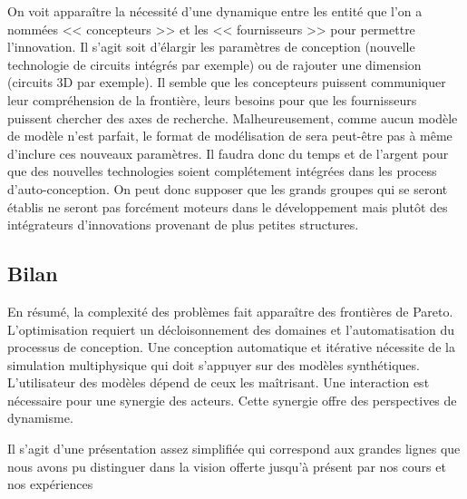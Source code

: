 \documentclass[11pt]{article}
\begin{document}
On voit apparaître la nécessité d'une dynamique entre les entité que l'on a nommées << concepteurs >> et les << fournisseurs >> pour permettre l'innovation. Il s'agit soit d'élargir les paramètres de conception (nouvelle technologie de circuits intégrés par exemple) ou de rajouter une dimension (circuits 3D par exemple). Il semble que les concepteurs puissent communiquer leur compréhension de la frontière, leurs besoins pour que les fournisseurs puissent chercher des axes de recherche. Malheureusement, comme aucun modèle de modèle n'est parfait, le format de modélisation de sera peut-être pas à même d'inclure ces nouveaux paramètres. Il faudra donc du temps et de l'argent pour que des nouvelles technologies soient complétement intégrées dans les process d'auto-conception. On peut donc supposer que les grands groupes qui se seront établis ne seront pas forcément moteurs dans le développement mais plutôt des intégrateurs d'innovations provenant de plus petites structures.

\subsection{Bilan}

En résumé, la complexité des problèmes fait apparaître des frontières de Pareto. L'optimisation requiert un décloisonnement des domaines et l'automatisation du processus de conception. Une conception automatique et itérative nécessite de la simulation multiphysique qui doit s'appuyer sur des modèles synthétiques. L'utilisateur des modèles dépend de ceux les maîtrisant. Une interaction est nécessaire pour une synergie des acteurs. Cette synergie offre des perspectives de dynamisme.

Il s'agit d'une présentation assez simplifiée qui correspond aux grandes lignes que nous avons pu distinguer dans la vision offerte jusqu'à présent par nos cours et nos expériences
\end{document}
